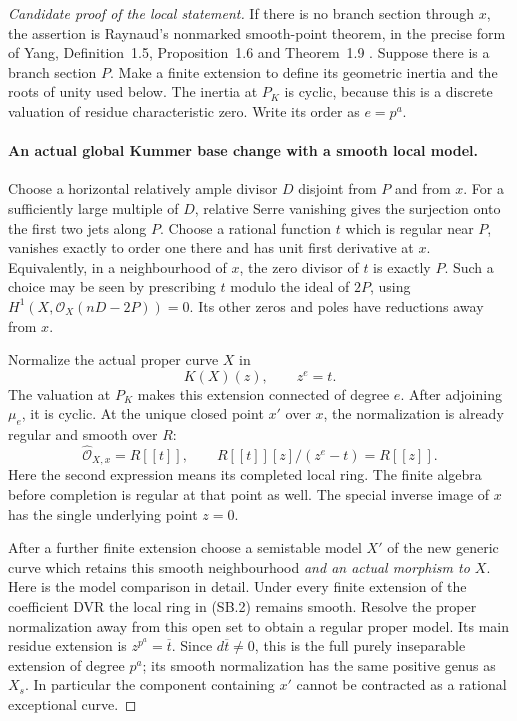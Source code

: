 \begin{proof}[Candidate proof of the local statement]
If there is no branch section through \(x\), the assertion is
Raynaud's nonmarked smooth-point theorem, in the precise form
of Yang, Definition~1.5, Proposition~1.6 and Theorem~1.9
\cite{fghYang2024}. Suppose there is a branch section \(P\).
Make a finite extension to define its geometric inertia and
the roots of unity used below. The inertia at \(P_K\) is
cyclic, because this is a discrete valuation of residue
characteristic zero. Write its order as \(e=p^a\).

\paragraph{An actual global Kummer base change with a smooth local model.}
Choose a horizontal relatively ample divisor \(D\) disjoint
from \(P\) and from \(x\). For a sufficiently large multiple
of \(D\), relative Serre vanishing gives the surjection onto
the first two jets along \(P\). Choose a rational function
\(t\) which is regular near \(P\), vanishes exactly to
order one there and has unit first derivative at \(x\).
Equivalently, in a neighbourhood of \(x\), the zero divisor
of \(t\) is exactly \(P\). Such a choice may be seen by
prescribing \(t\) modulo the ideal of \(2P\), using
\(H^1(X,\mathcal O_X(nD-2P))=0\). Its other zeros and
poles have reductions away from \(x\).

Normalize the actual proper curve \(X\) in
\[
                    K(X)(z),\qquad z^e=t.                 \tag{SB.1}
\]
The valuation at \(P_K\) makes this extension connected
of degree \(e\). After adjoining \(\mu_e\), it is cyclic.
At the unique closed point \(x'\) over \(x\), the
normalization is already regular and smooth over \(R\):
\[
 \widehat{\mathcal O}_{X,x}=R[[t]],\qquad
 R[[t]][z]/(z^e-t)=R[[z]].                               \tag{SB.2}
\]
Here the second expression means its completed local ring.
The finite algebra before completion is regular at that
point as well. The special inverse image of \(x\) has
the single underlying point \(z=0\).

After a further finite extension choose a semistable model
\(X'\) of the new generic curve which retains this smooth
neighbourhood \emph{and an actual morphism to \(X\)}.
Here is the model comparison in detail. Under every finite
extension of the coefficient DVR the local ring in (SB.2)
remains smooth. Resolve the proper normalization away from
this open set to obtain a regular proper model. Its main
residue extension is
\(z^{p^a}=\overline t\). Since \(d\overline t\ne0\),
this is the full purely inseparable extension of degree
\(p^a\); its smooth normalization has the same positive
genus as \(X_s\). In particular the component containing
\(x'\) cannot be contracted as a rational exceptional curve.


\end{proof}
